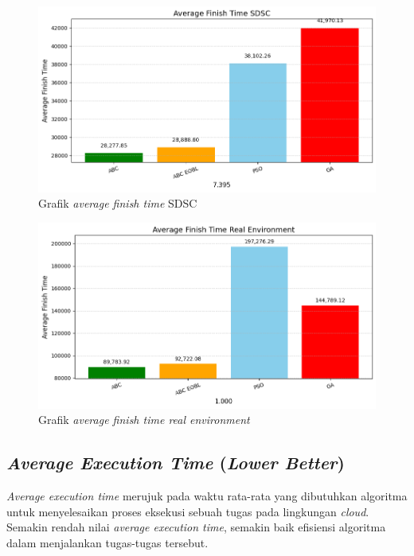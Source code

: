 \begin{figure} [H]
    \centering
    \includegraphics[width=0.75\linewidth]{gambar/Grafik Average Finish Time SDSC.png}
    \caption{Grafik \textit{average finish time} SDSC}
\end{figure}

\newpage

\begin{figure} [H]
    \centering
    \includegraphics[width=0.75\linewidth]{gambar/Grafik Average Finish Time Real Environment.png}
    \caption{Grafik \textit{average finish time real environment}}
\end{figure}

\subsection{\textit{Average Execution Time} (\textit{Lower Better})}
\textit{Average execution time} merujuk pada waktu rata-rata yang dibutuhkan algoritma untuk menyelesaikan proses eksekusi sebuah tugas pada lingkungan \textit{cloud}. Semakin rendah nilai \textit{average execution time}, semakin baik efisiensi algoritma dalam menjalankan tugas-tugas tersebut.

